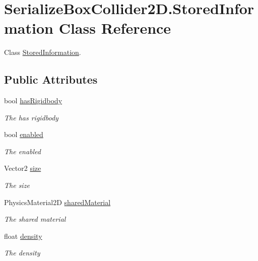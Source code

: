 \hypertarget{class_serialize_box_collider2_d_1_1_stored_information}{}\section{Serialize\+Box\+Collider2\+D.\+Stored\+Information Class Reference}
\label{class_serialize_box_collider2_d_1_1_stored_information}


Class \hyperlink{class_serialize_box_collider2_d_1_1_stored_information}{Stored\+Information}.  


\subsection*{Public Attributes}
\begin{DoxyCompactItemize}
\item 
bool \hyperlink{class_serialize_box_collider2_d_1_1_stored_information_a80e4075825133b16d17ebf4619b59d4b}{has\+Rigidbody}
\begin{DoxyCompactList}\small\item\em The has rigidbody \end{DoxyCompactList}\item 
bool \hyperlink{class_serialize_box_collider2_d_1_1_stored_information_a0f2561a0ffd44f371c7db9d0523634f6}{enabled}
\begin{DoxyCompactList}\small\item\em The enabled \end{DoxyCompactList}\item 
Vector2 \hyperlink{class_serialize_box_collider2_d_1_1_stored_information_a463e3c144b1d0aaffc9e891628c41e87}{size}
\begin{DoxyCompactList}\small\item\em The size \end{DoxyCompactList}\item 
Physics\+Material2D \hyperlink{class_serialize_box_collider2_d_1_1_stored_information_a00065b4309a794e0b8dfd50e582dbf37}{shared\+Material}
\begin{DoxyCompactList}\small\item\em The shared material \end{DoxyCompactList}\item 
float \hyperlink{class_serialize_box_collider2_d_1_1_stored_information_a416e473bfb0812a5654d3b2b5cecf0b2}{density}
\begin{DoxyCompactList}\small\item\em The density \end{DoxyCompactList}\end{DoxyCompactItemize}


